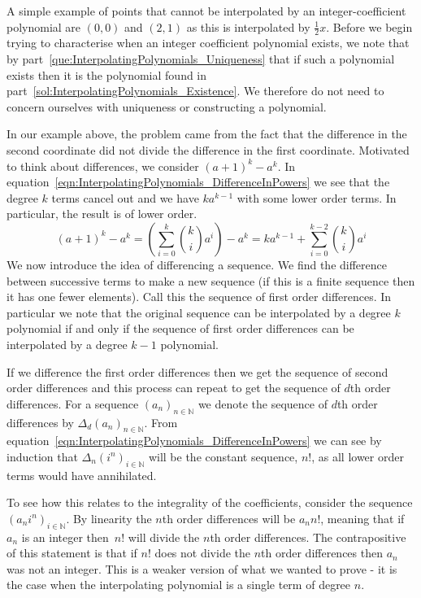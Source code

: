 \begin{parts}
	\begin{solution}
		
		A simple example of points that cannot be interpolated by an integer-coefficient polynomial are $(0, 0)$ and $(2, 1)$ as this is interpolated by $\frac{1}{2}x$. Before we begin trying to characterise when an integer coefficient polynomial exists, we note that by part~\ref{que:InterpolatingPolynomials_Uniqueness} that if such a polynomial exists then it is the polynomial found in part~\ref{sol:InterpolatingPolynomials_Existence}. We therefore do not need to concern ourselves with uniqueness or constructing a polynomial.
		
		In our example above, the problem came from the fact that the difference in the second coordinate did not divide the difference in the first coordinate. Motivated to think about differences, we consider $(a + 1)^k - a^k$. In equation~\eqref{eqn:InterpolatingPolynomials_DifferenceInPowers} we see that the degree $k$ terms cancel out and we have $ka^{k - 1}$ with some lower order terms. In particular, the result is of lower order.
		\begin{equation}
			(a + 1)^k - a^k = \left( \sum_{i=0}^k \binom{k}{i} a^i \right) - a^k = k a^{k - 1} + \sum_{i=0}^{k - 2} \binom{k}{i} a^i
			\label{eqn:InterpolatingPolynomials_DifferenceInPowers}
		\end{equation}
		We now introduce the idea of differencing a sequence. We find the difference between successive terms to make a new sequence (if this is a finite sequence then it has one fewer elements). Call this the sequence of first order differences. In particular we note that the original sequence can be interpolated by a degree $k$ polynomial if and only if the sequence of first order differences can be interpolated by a degree $k - 1$ polynomial.
		
		If we difference the first order differences then we get the sequence of second order differences and this process can repeat to get the sequence of $d$th order differences. For a sequence $(a_n)_{n \in \mathbb{N}}$ we denote the sequence of $d$th order differences by $\Delta_d (a_n)_{n \in \mathbb{N}}$. From equation~\eqref{eqn:InterpolatingPolynomials_DifferenceInPowers} we can see by induction that $\Delta_n (i^n)_{i \in \mathbb{N}}$ will be the constant sequence, $n!$, as all lower order terms would have annihilated.
		
		To see how this relates to the integrality of the coefficients, consider the sequence $(a_n i^n)_{i \in \mathbb{N}}$. By linearity the $n$th order differences will be $a_n n!$, meaning that if $a_n$ is an integer then~$n!$ will divide the $n$th order differences. The contrapositive of this statement is that if $n!$ does not divide the $n$th order differences then $a_n$ was not an integer. This is a weaker version of what we wanted to prove - it is the case when the interpolating polynomial is a single term of degree $n$.
		

\end{solution}
\end{parts}
